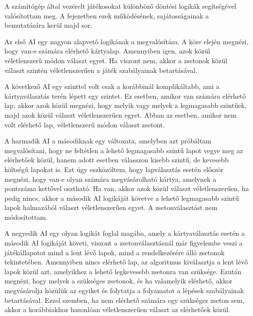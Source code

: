
A számítógép által vezérelt játékosokat különböző döntési logikák segítségével valósítottam meg. A fejezetben ezek működésének, sajátosságainak a bemutatására kerül majd sor.



Az első AI egy nagyon alapvető logikának a megvalósítása. A köre elején megnézi, hogy van-e számára elérhető kártyalap. Amennyiben igen, azok közül véletlenszerű módon választ egyet. Ha viszont nem, akkor a zsetonok közül választ szintén véletlenszerűen a játék szabályainak betartásával.


A következő AI egy szinttel volt csak a korábbinál komplikáltabb, ami a kártyaválasztás terén lépett egy szintet. Ez esetben, amikor van számára elérhető lap, akkor azok közül megnézi, hogy melyik vagy melyek a legmagasabb szintűek, majd azok közül választ véletlenszerűen egyet. Abban az esetben, amikor nem volt elérhető lap, véletlenszerű módon választ zsetont.


A harmadik AI a másodiknak egy változata, amelyben azt próbáltam megvalósítani, hogy ne feltétlen a lehető legmagasabb szintű lapot vegye meg az elérhetőek közül, hanem adott esetben válasszon kisebb szintű, de kevesebb költségű lapokat is. Ezt úgy eszközöltem, hogy lapválasztás esetén először megnézi, hogy van-e olyan számára megvásárolható kártya, amelynek a pontszáma kettővel osztható. Ha van, akkor azok közül választ véletlenszerűen, ha pedig nincs, akkor a második AI logikáját követve a lehető legmagasabb szintű lapok halmazából választ véletlenszerűen egyet. A zsetonválasztást nem módosítottam.

\newpage


A negyedik AI egy olyan logikát foglal magába, amely a kártyaválasztás esetén a második AI logikáját követi, viszont a zsetonválasztásnál már figyelembe veszi a játékállapotot mind a lent lévő lapok, mind a rendelkezésére álló zsetonok tekintetében. Amennyiben nincs elérhető lap, az algoritmus kiválasztja a lent lévő lapok közül azt, amelyikhez a lehető legkevesebb zsetonra van szüksége. Ezután megnézi, hogy melyek a szükséges zsetonok, és ha valamelyik elérhető, akkor megvásárolja közülük az egyiket és folytatja a folyamatot a lépések szabályainak betartásával. Ezzel szemben, ha nem elérhető számára egy szükséges zseton sem, akkor a korábbiakhoz hasonlóan véletlenszerűen választ az elérhetőek közül.

